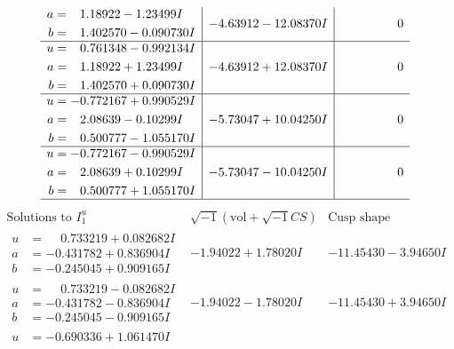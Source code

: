 \documentclass[1p]{elsarticle_modified}
\theoremstyle{definition}
\newcommand{\I}{\sqrt{-1}}
\begin{document}
$$\begin{array}{c|c|c}
\begin{aligned}
a &= \phantom{-}1.18922 - 1.23499 I \\
b &= \phantom{-}1.402570 - 0.090730 I\end{aligned}
 & -4.63912 - 12.08370 I & \phantom{-0.000000 } 0 \\ \hline\begin{aligned}
u &= \phantom{-}0.761348 - 0.992134 I \\
a &= \phantom{-}1.18922 + 1.23499 I \\
b &= \phantom{-}1.402570 + 0.090730 I\end{aligned}
 & -4.63912 + 12.08370 I & \phantom{-0.000000 } 0 \\ \hline\begin{aligned}
u &= -0.772167 + 0.990529 I \\
a &= \phantom{-}2.08639 - 0.10299 I \\
b &= \phantom{-}0.500777 - 1.055170 I\end{aligned}
 & -5.73047 + 10.04250 I & \phantom{-0.000000 } 0 \\ \hline\begin{aligned}
u &= -0.772167 - 0.990529 I \\
a &= \phantom{-}2.08639 + 0.10299 I \\
b &= \phantom{-}0.500777 + 1.055170 I\end{aligned}
 & -5.73047 - 10.04250 I & \phantom{-0.000000 } 0\\
 \hline 
 \end{array}$$\newpage$$\begin{array}{c|c|c}  
\text{Solutions to }I^u_{1}& \I (\text{vol} + \sqrt{-1}CS) & \text{Cusp shape}\\
 \hline 
\begin{aligned}
u &= \phantom{-}0.733219 + 0.082682 I \\
a &= -0.431782 + 0.836904 I \\
b &= -0.245045 + 0.909165 I\end{aligned}
 & -1.94022 + 1.78020 I & -11.45430 - 3.94650 I \\ \hline\begin{aligned}
u &= \phantom{-}0.733219 - 0.082682 I \\
a &= -0.431782 - 0.836904 I \\
b &= -0.245045 - 0.909165 I\end{aligned}
 & -1.94022 - 1.78020 I & -11.45430 + 3.94650 I \\ \hline\begin{aligned}
u &= -0.690336 + 1.061470 I \\

\end{aligned}
\end{array}$$
\end{document}
